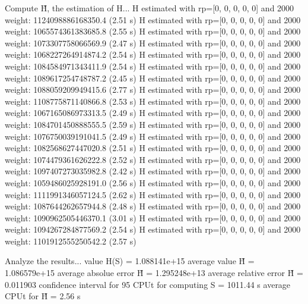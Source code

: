 Compute H̃, the estimation of H...
  H estimated with rp=[0, 0, 0, 0, 0] and 2000 weight:  1124098886168350.4  (2.51 s)
  H estimated with rp=[0, 0, 0, 0, 0] and 2000 weight:  1065574361383685.8  (2.55 s)
  H estimated with rp=[0, 0, 0, 0, 0] and 2000 weight:  1073307758066569.9  (2.47 s)
  H estimated with rp=[0, 0, 0, 0, 0] and 2000 weight:  1068227264914874.2  (2.54 s)
  H estimated with rp=[0, 0, 0, 0, 0] and 2000 weight:  1084584971343411.9  (2.54 s)
  H estimated with rp=[0, 0, 0, 0, 0] and 2000 weight:  1089617254748787.2  (2.45 s)
  H estimated with rp=[0, 0, 0, 0, 0] and 2000 weight:  1088059209949415.6  (2.77 s)
  H estimated with rp=[0, 0, 0, 0, 0] and 2000 weight:  1108775871140866.8  (2.53 s)
  H estimated with rp=[0, 0, 0, 0, 0] and 2000 weight:  1067165086973313.5  (2.49 s)
  H estimated with rp=[0, 0, 0, 0, 0] and 2000 weight:  1084701450888555.5  (2.59 s)
  H estimated with rp=[0, 0, 0, 0, 0] and 2000 weight:  1076750039191041.5  (2.49 s)
  H estimated with rp=[0, 0, 0, 0, 0] and 2000 weight:  1082568627447020.8  (2.51 s)
  H estimated with rp=[0, 0, 0, 0, 0] and 2000 weight:  1074479361626222.8  (2.52 s)
  H estimated with rp=[0, 0, 0, 0, 0] and 2000 weight:  1097407273035982.8  (2.42 s)
  H estimated with rp=[0, 0, 0, 0, 0] and 2000 weight:  1059486025928191.0  (2.56 s)
  H estimated with rp=[0, 0, 0, 0, 0] and 2000 weight:  1111991346057124.5  (2.62 s)
  H estimated with rp=[0, 0, 0, 0, 0] and 2000 weight:  1087644262657944.8  (2.48 s)
  H estimated with rp=[0, 0, 0, 0, 0] and 2000 weight:  1090962505446370.1  (3.01 s)
  H estimated with rp=[0, 0, 0, 0, 0] and 2000 weight:  1094267284877569.2  (2.54 s)
  H estimated with rp=[0, 0, 0, 0, 0] and 2000 weight:  1101912555250542.2  (2.57 s)

Analyze the results...
  value H(S)                  = 1.088141e+15 
  average value H̃             = 1.086579e+15 
  average absolue error H̃     = 1.295248e+13 
  average relative error H̃    = 0.011903 
  confidence interval for 95%
  CPUt for computing S         = 1011.44 s
  average CPUt for H̃           = 2.56 s

